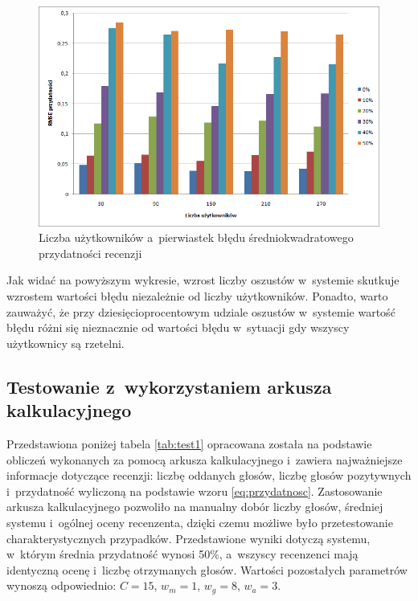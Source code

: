 \begin{figure}[h]
	\centering
	\includegraphics[width=\textwidth, keepaspectratio=true]{images/LiarsTest.png}
	\caption{Liczba użytkowników a~pierwiastek błędu średniokwadratowego przydatności recenzji}\label{fig:test3}
\end{figure}

Jak widać na powyższym wykresie, wzrost liczby oszustów w~systemie skutkuje wzrostem wartości błędu niezależnie od liczby użytkowników. Ponadto, warto zauważyć, że przy dziesięcioprocentowym udziale oszustów w~systemie wartość błędu różni się nieznacznie od wartości błędu w~sytuacji gdy wszyscy użytkownicy są rzetelni.

\subsection{Testowanie z~wykorzystaniem arkusza kalkulacyjnego}

Przedstawiona poniżej tabela \ref{tab:test1} opracowana została na podstawie obliczeń wykonanych za pomocą arkusza kalkulacyjnego i~zawiera najważniejsze informacje dotyczące recenzji: liczbę oddanych głosów, liczbę głosów pozytywnych i~przydatność wyliczoną na podstawie wzoru \ref{eq:przydatnosc}. Zastosowanie arkusza kalkulacyjnego pozwoliło na manualny dobór liczby głosów, średniej systemu i~ogólnej oceny recenzenta, dzięki czemu możliwe było przetestowanie charakterystycznych przypadków. Przedstawione wyniki dotyczą systemu, w~którym średnia przydatność wynosi 50\%, a~wszyscy recenzenci mają identyczną ocenę i~liczbę otrzymanych głosów. Wartości pozostałych parametrów wynoszą odpowiednio: $C=15$, $w_{m}=1$, $w_{g}=8$, $w_{a}=3$.

